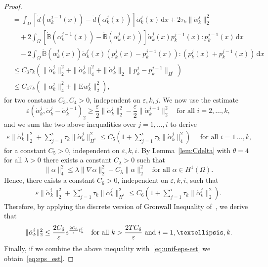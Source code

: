 \documentclass[reqno]{amsart}
\theoremstyle{definition}
\numberwithin{equation}{section}
\def\de {\mathrm{d}}
\def\B {\mathbb B}
\def\EE {\mathrm{E}}
\begin{document}
\begin{proof}
\begin{align}
&=\int_\Omega [\dot{d}(\alpha_k^{j-1}(x))-\dot{d}(\alpha_k^j(x))]\dot\alpha_k^j(x) \,\de x+2\tau_k\|\dot\alpha_k^j\|_2^2\nonumber\\
&\quad+2\int_\Omega [\dot{\B}(\alpha_k^{j-1}(x))-\dot{\B}(\alpha_k^j(x))]\dot\alpha_k^j(x)p_k^{j-1}(x):p_k^{j-1}(x) \,\de x\nonumber\\
&\quad-2\int_\Omega \dot{\B}(\alpha_k^j(x))\dot\alpha_k^j(x)(p_k^j(x)-p_k^{j-1}(x)):(p_k^j(x)+p_k^{j-1}(x)) \,\de x\nonumber\\
&\le C_3\tau_k(\|\dot\alpha_k^j\|_2^2+\|\dot\alpha_k^j\|_4^2+\|\dot\alpha_k^j\|_2\|p_k^j-p_k^{j-1}\|_{H^1})\nonumber\\
&\le C_4\tau_k(\|\dot\alpha_k^j\|_4^2+\|\EE \dot w_k^j\|_2^2),\label{eq:dotak-est}
\end{align}
for two constants $C_3,C_4>0$, independent on $\varepsilon,k,j$. We now use the estimate
\begin{equation*}\varepsilon(\dot\alpha_k^j,\dot\alpha_k^j-\dot\alpha_k^{j-1})_2\ge \frac{\varepsilon}{2}\|\dot\alpha_k^j\|_2^2-\frac{\varepsilon}{2}\|\dot\alpha_k^{j-1}\|_2^2\quad\text{for all $i=2,\dots,k$},\end{equation*}
and we sum the two above inequalities over $j=1,\dots,i$ to derive
\begin{align*}
\varepsilon\|\dot\alpha_k^i\|_2^2+\sum_{j=1}^i\tau_k\|\dot\alpha_k^j\|_{H^1}^2\le C_5\left(1+\sum_{j=1}^i\tau_k\|\dot\alpha_k^j\|_4^2\right)\quad\text{ for all $i=1\,\dots,k$},
\end{align*}
for a constant $C_5>0$, independent on $\varepsilon,k,i$. By Lemma~\ref{lem:Cdelta} with $\theta=4$ for all $\lambda>0$ there exists a constant $C_\lambda>0$ such that
\begin{equation*}\|\alpha\|_4^2\le \lambda\|\nabla \alpha\|_2^2+C_\lambda\|\alpha\|_2^2\quad\text{for all $\alpha\in H^1(\Omega)$}.\end{equation*}
Hence, there exists a constant $C_6>0$, independent on $\varepsilon,k,i$, such that
\begin{align}\label{eq:unif-eps-est}
\varepsilon\|\dot\alpha_k^i\|_2^2+\sum_{j=1}^i\tau_k\|\dot\alpha_k^j\|_{H^1}^2\le C_6\left(1+\sum_{j=1}^i\tau_k\|\dot\alpha_k^j\|_2^2\right).
\end{align}
Therefore, by applying the discrete version of Gronwall Inequality of~\cite[Lemma~3.2.4]{AGS}, we derive that
$$\|\dot\alpha_k^i\|_2^2\le \frac{2C_6}{\varepsilon}{\rm e}^{\frac{2C_6}{\varepsilon}t_k^i}\quad\text{for all $k>\frac{2TC_6}{\varepsilon}$ and $i=1,\dots,k$}.$$
Finally, if we combine the above inequality with~\eqref{eq:unif-eps-est} we obtain~\eqref{eq:eps_est}.
\end{proof}
\end{document}
